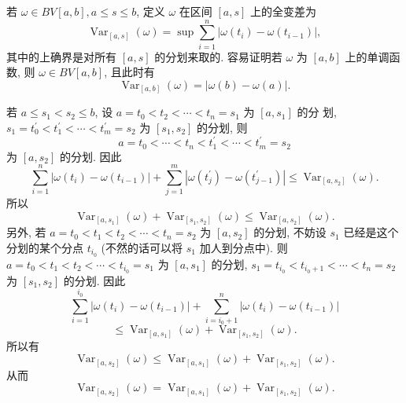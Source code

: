 \documentclass[openany]{ctexbook}
\theoremstyle{kaiti}
\theoremstyle{normal}
\begin{document}
若 $\omega \in B V[a, b], a \leqslant s \leqslant b$, 定义 $\omega$ 在区间 $[a, s]$ 上的全变差为
$$
\operatorname{Var}_{[a, s]}(\omega)=\sup\sum_{i=1}^n\left|\omega\left(t_{i}\right)-\omega\left(t_{i-1}\right)\right|,
$$
其中的上确界是对所有 $[a, s]$ 的分划来取的. 容易证明若 $\omega$ 为 $[a, b]$ 上的单调函数, 则 $\omega \in B V[a, b]$, 且此时有
$$
\operatorname{Var}_{[a, b]}(\omega)=|\omega(b)-\omega(a)|.
$$

若 $a \leqslant s_1<s_2 \leqslant b$, 设 $a=t_0<t_2<\cdots<t_n=s_1$ 为 $\left[a, s_1\right]$ 的分 划, $s_1=t_0^{\prime}<t_1^{\prime}<\cdots<t_m^{\prime}=s_2$ 为 $\left[s_1, s_2\right]$ 的分划, 则
$$
a=t_0<\cdots<t_n<t_1^{\prime}<\cdots<t_m^{\prime}=s_2
$$
为 $\left[a, s_2\right]$ 的分划. 因此
$$
\sum_{i=1}^n\left|\omega\left(t_{i}\right)-\omega\left(t_{i-1}\right)\right|+\sum_{j=1}^m\left|\omega\left(t_{j}^{\prime}\right)-\omega\left(t_{j-1}^{\prime}\right)\right| \leqslant \operatorname{Var}_{\left[a, s_2\right]}(\omega).
$$
所以
$$
\operatorname{Var}_{\left[a, s_1\right]}(\omega)+\operatorname{Var}_{\left[s_1, s_2\right]}(\omega) \leqslant \operatorname{Var}_{\left[a, s_2\right]}(\omega).
$$
另外, 若 $a=t_0<t_1<t_2<\cdots<t_n=s_2$ 为 $\left[a, s_2\right]$ 的分划, 不妨设 $s_1$ 已经是这个分划的某个分点 $t_{i_0}$ (不然的话可以将 $s_1$ 加人到分点中). 则 $a=t_0<t_1<t_2<\cdots<t_{i_0}=s_1$ 为 $\left[a, s_1\right]$ 的分划, $s_1=t_{i_0}<t_{i_0+1}<\cdots<t_n=s_2$ 为 $\left[s_1, s_2\right]$ 的分划. 因此
$$
\sum_{i=1}^{i_0}\left|\omega\left(t_{i}\right)-\omega\left(t_{i-1}\right)\right|+\sum_{i=i_0+1}^n\left|\omega\left(t_{i}\right)-\omega\left(t_{i-1}\right)\right|
$$
$$
\leqslant \operatorname{Var}_{\left[a, s_1\right]}(\omega)+\operatorname{Var}_{\left[s_1, s_2\right]}(\omega).
$$
所以有
$$
\operatorname{Var}_{\left[a, s_2\right]}(\omega) \leqslant \operatorname{Var}_{\left[a, s_1\right]}(\omega)+\operatorname{Var}_{\left[s_1, s_2\right]}(\omega).
$$
从而
\begin{equation}
  \operatorname{Var}_{\left[a, s_2\right]}(\omega)=\operatorname{Var}_{\left[a, s_1\right]}(\omega)+\operatorname{Var}_{\left[s_1, s_2\right]}(\omega).
\end{equation}
\end{document}
